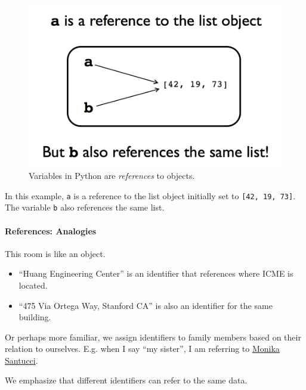 \documentclass[12pt,letterpaper,twoside]{article}
\begin{document}
\begin{figure}[!h]
\centering
\includegraphics[scale=0.35]{fig/references.png}
\caption{{ \small Variables in Python are \emph{references} to objects.}}
\end{figure}

In this example, \texttt{a} is a reference to the list object initially
set to \texttt{{[}42,\ 19,\ 73{]}}. The variable \texttt{b} also
references the same list.

\paragraph{References: Analogies}   This room is like an object.
\vspace{-10pt}
\begin{itemize}
\item
  ``Huang Engineering Center'' is an identifier that references where ICME is located.
\item
  ``475 Via Ortega Way, Stanford CA'' is also an identifier for the same building.
\end{itemize}

Or perhaps more familiar, we assign identifiers to family members based on their relation
to ourselves. E.g. when I say ``my sister'', I am referring to 
\href{https://soundcloud.com/monikasantucci}{Monika Santucci}.

We emphasize that different identifiers can refer to the same data.

\vspace{-3ex}
\end{document}

